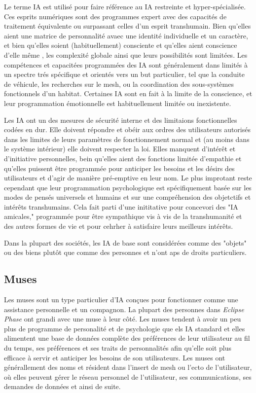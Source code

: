 Le terme IA est utilisé pour faire référence au IA restreinte et hyper-spécialisée. Ces esprits numériques sont des programmes expert avec des capacités de traitement équivalente ou surpassant celles d'un esprit transhumain. Bien qu'elles aient une matrice de personnalité avaec une identité individuelle et un caractère, et bien qu'elles soient (habituellement) consciente et qu'elles aient conscience d'elle même , les complexité globale ainsi que leurs possibilités sont limitées. Les compétences et capacitées programmées des IA sont généralement dans limités à un spectre trés spécifique et orientés vers un but particulier, tel que la conduite de véhicule, les recherches sur le mesh, ou la coordination des sous-systèmes fonctionnels d'un habitat. Certaines IA sont en fait à la limite de la conscience, et leur programmation émotionnelle est habituellement limitée ou inexistente. 

Les IA ont un des mesures de sécurité interne et des limitaions fonctionnelles codées en dur. Elle doivent répondre et obéir aux ordres des utilisateurs autorisés dans les limites de leurs paramètres de fonctionnement normal et (au moins dans le système intérieur) elle doivent respecter la loi. Elles manquent d'intérêt et d'initiative personnelles, bein qu'elles aient des fonctions limitée d'empathie et qu'elles puissent être programmée pour anticiper les besoins et les désirs des utilisateurs et d'agir de manière pré-emptive en leur nom. Le plus improtant reste cependant que leur programmation psychologique est spécifiquement basée sur les modes de pensés universels et humains et sur une compréhension des objetctifs et intérêts transhumains. Cela fait parti d'une inititative pour concevori des "IA amicales," programmée pour être sympathique vis à vis de la transhumanité et des autres formes de vie et pour cehrher à satisfaire leurs meilleurs intérêts. 

Dans la plupart des sociétés, les IA de base sont considérées comme des "objets" ou des biens plutôt que comme des personnes et n'ont aps de droits particuliers. 

\subsection{Muses} 

Les muses sont un type particulier d'IA conçues pour fonctionner comme une assistance personnelle et un compagnon. La plupart des personnes dans \textit{Eclipse Phase} ont grandi avec une muse à leur côté. Les muses tendent à avoir un peu plus de programme de personalité et de psychologie que els IA standard et elles alimentent une base de données complète des préférences de leur utilisateur au fil du temps, ses préférences et ses traits de personnalités afin qu'elle soit plus efficace à servir et anticiper les besoins de son utilisateurs. Les muses ont générallement des noms et résident dans l'insert de mesh ou l'ecto de l'utilisateur, où elles peuvent gérer le réseau personnel de l'utilisateur, ses communications, ses demandes de données et ainsi de suite. 

